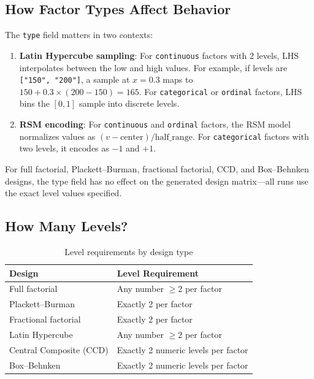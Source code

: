 \documentclass[11pt]{book}
\begin{document}
\subsection{How Factor Types Affect Behavior}

The \texttt{type} field matters in two contexts:

\begin{enumerate}
  \item \textbf{Latin Hypercube sampling}: For \texttt{continuous} factors with 2 levels, LHS interpolates between the low and high values. For example, if levels are \texttt{["150", "200"]}, a sample at $x=0.3$ maps to $150 + 0.3 \times (200 - 150) = 165$. For \texttt{categorical} or \texttt{ordinal} factors, LHS bins the $[0,1]$ sample into discrete levels.
  \item \textbf{RSM encoding}: For \texttt{continuous} and \texttt{ordinal} factors, the RSM model normalizes values as $(v - \text{center}) / \text{half\_range}$. For \texttt{categorical} factors with two levels, it encodes as $-1$ and $+1$.
\end{enumerate}

For full factorial, Plackett--Burman, fractional factorial, CCD, and Box--Behnken designs, the type field has no effect on the generated design matrix---all runs use the exact level values specified.

\subsection{How Many Levels?}

\begin{table}[H]
\centering
\caption{Level requirements by design type}
\begin{tabular}{@{}ll@{}}
\toprule
\textbf{Design} & \textbf{Level Requirement} \\
\midrule
Full factorial & Any number $\geq 2$ per factor \\
Plackett--Burman & Exactly 2 per factor \\
Fractional factorial & Exactly 2 per factor \\
Latin Hypercube & Any number $\geq 2$ per factor \\
Central Composite (CCD) & Exactly 2 numeric levels per factor \\
Box--Behnken & Exactly 2 numeric levels per factor \\
\bottomrule
\end{tabular}
\end{table}
\end{document}
